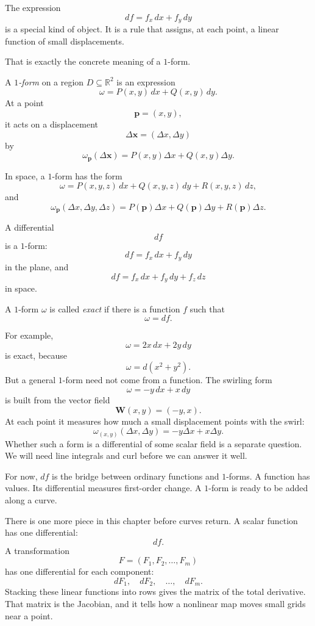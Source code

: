 The expression
\[
    df=f_x\,dx+f_y\,dy
\]
is a special kind of object.  It is a rule that assigns, at each point, a linear function of
small displacements.

That is exactly the concrete meaning of a \(1\)-form.

\begin{definition}
A \emph{\(1\)-form} on a region \(D\subseteq\mathbb R^2\) is an expression
\[
\boxed{
    \omega=P(x,y)\,dx+Q(x,y)\,dy.
}
\]
At a point
\[
    \mathbf p=(x,y),
\]
it acts on a displacement
\[
    \Delta\mathbf x=(\Delta x,\Delta y)
\]
by
\[
\boxed{
    \omega_{\mathbf p}(\Delta\mathbf x)
    =
    P(x,y)\Delta x+Q(x,y)\Delta y.
}
\]
\end{definition}

In space, a \(1\)-form has the form
\[
\boxed{
    \omega=P(x,y,z)\,dx+Q(x,y,z)\,dy+R(x,y,z)\,dz,
}
\]
and
\[
\boxed{
    \omega_{\mathbf p}(\Delta x,\Delta y,\Delta z)
    =
    P(\mathbf p)\Delta x+Q(\mathbf p)\Delta y+R(\mathbf p)\Delta z.
}
\]

A differential
\[
    df
\]
is a \(1\)-form:
\[
\boxed{
    df=f_x\,dx+f_y\,dy
}
\]
in the plane, and
\[
\boxed{
    df=f_x\,dx+f_y\,dy+f_z\,dz
}
\]
in space.

\begin{definition}
A \(1\)-form \(\omega\) is called \emph{exact} if there is a function \(f\) such that
\[
    \omega=df.
\]
\end{definition}

For example,
\[
    \omega=2x\,dx+2y\,dy
\]
is exact, because
\[
    \omega=d(x^2+y^2).
\]
But a general \(1\)-form need not come from a function.  The swirling form
\[
    \omega=-y\,dx+x\,dy
\]
is built from the vector field
\[
    \mathbf W(x,y)=(-y,x).
\]
At each point it measures how much a small displacement points with the swirl:
\[
    \omega_{(x,y)}(\Delta x,\Delta y)
    =
    -y\Delta x+x\Delta y.
\]
Whether such a form is a differential of some scalar field is a separate question.  We
will need line integrals and curl before we can answer it well.

For now, \(df\) is the bridge between ordinary functions and \(1\)-forms.  A function
has values.  Its differential measures first-order change.  A \(1\)-form is ready to be
added along a curve.

There is one more piece in this chapter before curves return.  A scalar function has one
differential:
\[
    df.
\]
A transformation
\[
    F=(F_1,F_2,\ldots,F_m)
\]
has one differential for each component:
\[
    dF_1,\quad dF_2,\quad \ldots,\quad dF_m.
\]
Stacking these linear functions into rows gives the matrix of the total derivative.  That
matrix is the Jacobian, and it tells how a nonlinear map moves small grids near a point.
